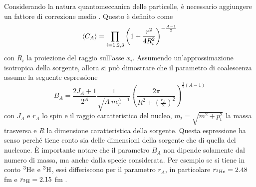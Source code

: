 Considerando la natura quantomeccanica delle particelle, è necessario aggiungere un fattore di correzione medio \cite{Scheibl_1999_wigner}.
Questo è definito come
\begin{equation}
    \langle C_A \rangle = \prod_{i=1,2,3}\left(1+\dfrac{r^2}{4R_i^2}\right)^{-\frac{A-1}2}
\end{equation}
con $R_i$ la proiezione del raggio sull'asse $x_i$.
Assumendo un'approssimazione isotropica della sorgente, allora si può dimostrare che il parametro di coalescenza assume la seguente espressione
\begin{equation}
    B_A = \dfrac{2J_A+1}{2^A}\dfrac{1}{\sqrt{A\ m_T^{A-1}}} \left(\dfrac{2\pi}{R^2 + \left(\frac{r_A}{2}\right)^2}\right)^{\frac32(A-1)}
\end{equation}
con $J_A$ e $r_A$ lo spin e il raggio caratteristico del nucleo, $m_t = \sqrt{m^2+p_t^2}$ la massa trasversa e $R$ la dimensione caratteristica della sorgente.
Questa espressione ha senso perché tiene conto sia delle dimensioni della sorgente che di quella del nucleone.
È importante notare che il parametro $B_A$ non dipende solamente dal numero di massa, ma anche dalla specie considerata.
Per esempio se si tiene in conto $^{3}{\rm He}$ e $^{3}{\rm H}$, essi differiscono per il parametro $r_A$, in particolare $r_{^{3}{\rm He}} =  2.48$ fm e $r_{^{3}{\rm H}} = 2.15$ fm \cite{PURCELL20151_nuclear_sheet}.\\

